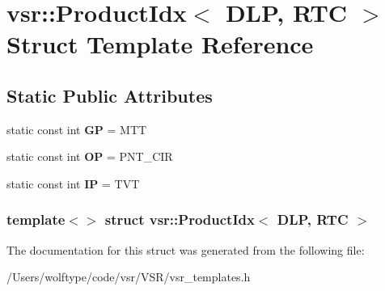\hypertarget{structvsr_1_1_product_idx_3_01_d_l_p_00_01_r_t_c_01_4}{\section{vsr\-:\-:Product\-Idx$<$ D\-L\-P, R\-T\-C $>$ Struct Template Reference}
\label{structvsr_1_1_product_idx_3_01_d_l_p_00_01_r_t_c_01_4}
}
\subsection*{Static Public Attributes}
\begin{DoxyCompactItemize}
\item 
\hypertarget{structvsr_1_1_product_idx_3_01_d_l_p_00_01_r_t_c_01_4_a4117ccdaf41ca58fca81801161dbfa25}{static const int {\bfseries G\-P} = M\-T\-T}\label{structvsr_1_1_product_idx_3_01_d_l_p_00_01_r_t_c_01_4_a4117ccdaf41ca58fca81801161dbfa25}

\item 
\hypertarget{structvsr_1_1_product_idx_3_01_d_l_p_00_01_r_t_c_01_4_a609c468533dbf97da86f4fec89171874}{static const int {\bfseries O\-P} = P\-N\-T\-\_\-\-C\-I\-R}\label{structvsr_1_1_product_idx_3_01_d_l_p_00_01_r_t_c_01_4_a609c468533dbf97da86f4fec89171874}

\item 
\hypertarget{structvsr_1_1_product_idx_3_01_d_l_p_00_01_r_t_c_01_4_abbfe94ca52c8924f0884ff6a04007b2a}{static const int {\bfseries I\-P} = T\-V\-T}\label{structvsr_1_1_product_idx_3_01_d_l_p_00_01_r_t_c_01_4_abbfe94ca52c8924f0884ff6a04007b2a}

\end{DoxyCompactItemize}
\subsubsection*{template$<$$>$ struct vsr\-::\-Product\-Idx$<$ D\-L\-P, R\-T\-C $>$}



The documentation for this struct was generated from the following file\-:\begin{DoxyCompactItemize}
\item 
/\-Users/wolftype/code/vsr/\-V\-S\-R/vsr\-\_\-templates.\-h\end{DoxyCompactItemize}
